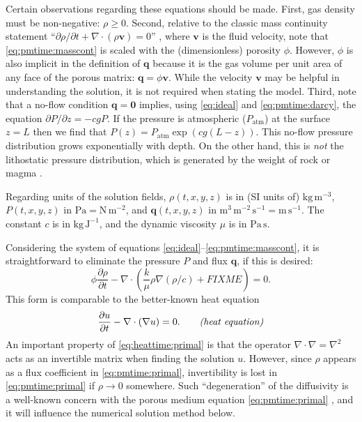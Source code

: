 \documentclass[11pt]{amsart}
\newcommand{\bq}{\mathbf{q}}
\newcommand{\bv}{\mathbf{v}}
\newcommand{\bzero}{\bm{0}}
\newcommand{\Div}{\nabla\cdot}
\newcommand{\grad}{\nabla}
\newcommand{\Patm}{P_{\text{atm}}}
\begin{document}
Certain observations regarding these equations should be made.  First, gas density must be non-negative: $\rho\ge 0$.  Second, relative to the classic mass continuity statement ``$\partial\rho/\partial t + \Div(\rho \bv)=0$'' \citep[equation (4.3)]{Tadmor2012}, where $\bv$ is the fluid velocity, note that \eqref{eq:pmtime:masscont} is scaled with the (dimensionless) porosity $\phi$.  However, $\phi$ is also implicit in the definition of $\bq$ because it is the gas volume per unit area of any face of the porous matrix: $\bq = \phi \bv$.  While the velocity $\bv$ may be helpful in understanding the solution, it is not required when stating the model.  Third, note that a no-flow condition $\bq=\bzero$ implies, using \eqref{eq:ideal} and \eqref{eq:pmtime:darcy}, the equation $\partial P/\partial z = -cg P$.  If the pressure is atmospheric ($\Patm$) at the surface $z=L$ then we find that $P(z) = \Patm \exp(cg(L-z))$.  This no-flow pressure distribution grows exponentially with depth.  On the other hand, this is \emph{not} the lithostatic pressure distribution, which is generated by the weight of rock or magma \citep[equation (5)]{Collinson2012}.

Regarding units of the solution fields, $\rho(t,x,y,z)$ is in (SI units of) $\text{kg}\,\text{m}^{-3}$, $P(t,x,y,z)$ in $\text{Pa} = \text{N}\,\text{m}^{-2}$, and $\bq(t,x,y,z)$ in $\text{m}^3\,\text{m}^{-2}\,\text{s}^{-1} = \text{m}\,\text{s}^{-1}$.  The constant $c$ is in $\text{kg}\,\text{J}^{-1}$, and the dynamic viscosity $\mu$ is in $\text{Pa}\,\text{s}$.

Considering the system of equations \eqref{eq:ideal}--\eqref{eq:pmtime:masscont}, it is straightforward to eliminate the pressure $P$ and flux $\bq$, if this is desired:
\begin{equation}
\phi \frac{\partial \rho}{\partial t} - \Div \left(\frac{k}{\mu} \rho \grad\left(\rho/c\right) + FIXME\right) = 0. \label{eq:pmtime:primal}
\end{equation}
This form is comparable to the better-known heat equation
\begin{equation}
\frac{\partial u}{\partial t} - \Div(\grad u) = 0. \qquad \text{\emph{(heat equation)}}\label{eq:heattime:primal}
\end{equation}
An important property of \eqref{eq:heattime:primal} is that the operator $\Div \grad = \grad^2$ acts as an invertible matrix when finding the solution $u$.  However, since $\rho$ appears as a flux coefficient in \eqref{eq:pmtime:primal}, invertibility is lost in \eqref{eq:pmtime:primal} if $\rho\to 0$ somewhere.  Such ``degeneration'' of the diffusivity is a well-known concern with the porous medium equation \eqref{eq:pmtime:primal} \citep[for example]{Vazquez2007}, and it will influence the numerical solution method below.
\end{document}
